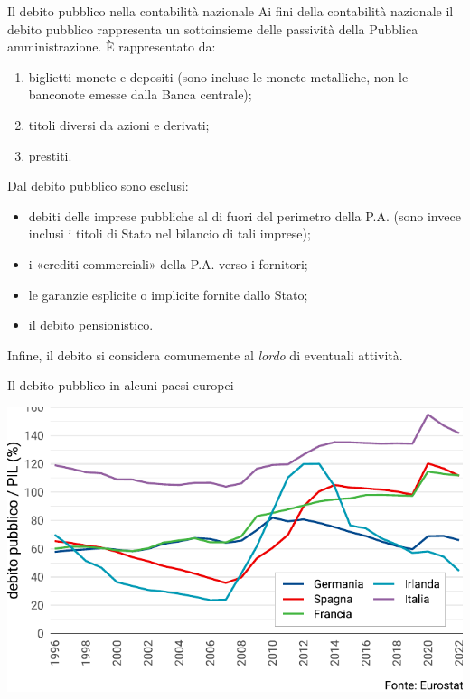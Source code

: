 \documentclass[aspectratio=149,11pt,italian]{beamer}
\begin{document}
\begin{frame}{Il debito pubblico nella contabilità nazionale}
Ai fini della contabilità nazionale il debito pubblico rappresenta un
sottoinsieme delle passività della Pubblica amministrazione. È rappresentato
da:
\begin{enumerate}
\item biglietti monete e depositi (sono incluse le monete metalliche, non le
banconote emesse dalla Banca centrale);
\item titoli diversi da azioni e derivati;
\item prestiti.
\end{enumerate}
Dal debito pubblico sono esclusi:
\begin{itemize}
\item debiti delle imprese pubbliche al di fuori del perimetro della P.A. (sono
invece inclusi i titoli di Stato nel bilancio di tali imprese);
\item i «crediti commerciali» della P.A. verso i fornitori;
\item le garanzie esplicite o implicite fornite dallo Stato;
\item il debito pensionistico.
\end{itemize}
Infine, il debito si considera comunemente al \emph{lordo} di eventuali attività.
\end{frame}

\begin{frame}{Il debito pubblico in alcuni paesi europei}
\begin{center}
\centering
\includegraphics[width=.9\textwidth]{./figure/debito-eu-color.pdf}
\end{center}
\end{frame}
\end{document}
